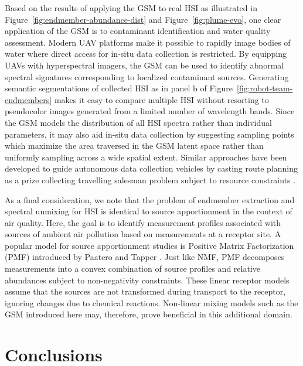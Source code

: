 \documentclass[remotesensing,article,submit,pdftex,moreauthors]{Definitions/mdpi}
\begin{document}
Based on the results of applying the GSM to real HSI as illustrated in Figure~\ref{fig:endmember-abundance-dist} and Figure~\ref{fig:plume-evo}, one clear application of the GSM is to contaminant identification and water quality assessment. Modern UAV platforms make it possible to rapidly image bodies of water where direct access for in-situ data collection is restricted. By equipping UAVs with hyperspectral imagers, the GSM can be used to identify abnormal spectral signatures corresponding to localized contaminant sources. Generating semantic segmentations of collected HSI as in panel b of Figure~\ref{fig:robot-team-endmembers} makes it easy to compare multiple HSI without resorting to pseudocolor images generated from a limited number of wavelength bands. Since the GSM models the distribution of all HSI spectra rather than individual parameters, it may also aid in-situ data collection by suggesting sampling points which maximize the area traversed in the GSM latent space rather than uniformly sampling across a wide spatial extent. Similar approaches have been developed to guide autonomous data collection vehicles by casting route planning as a prize collecting travelling salesman problem subject to resource constraints \cite{balas2007prize, suryan2020learning}.

As a final consideration, we note that the problem of endmember extraction and spectral unmixing for HSI is identical to source apportionment in the context of air quality. Here, the goal is to identify measurement profiles associated with sources of ambient air pollution based on measurements at a receptor site. A popular model for source apportionment studies is Positive Matrix Factorization (PMF) introduced by Paatero and Tapper \cite{pmf-orig, ulbrich2009interpretation}. Just like NMF, PMF decomposes measurements into a convex combination of source profiles and relative abundances subject to non-negativity constraints. These linear receptor models assume that the sources are not transformed during transport to the receptor, ignoring changes due to chemical reactions. Non-linear mixing models such as the GSM introduced here may, therefore, prove beneficial in this additional domain.


\section{Conclusions}\label{sec:conclusions}
\end{document}

